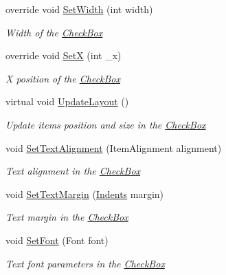 \begin{DoxyCompactItemize}
override void \mbox{\hyperlink{class_space_v_i_l_1_1_check_box_abcf26de1908f7d590b768d64851e8004}{Set\+Width}} (int width)
\begin{DoxyCompactList}\small\item\em Width of the \mbox{\hyperlink{class_space_v_i_l_1_1_check_box}{Check\+Box}} \end{DoxyCompactList}\item 
override void \mbox{\hyperlink{class_space_v_i_l_1_1_check_box_a321e86a7868cb30b842988a4d607acc1}{SetX}} (int \+\_\+x)
\begin{DoxyCompactList}\small\item\em X position of the \mbox{\hyperlink{class_space_v_i_l_1_1_check_box}{Check\+Box}} \end{DoxyCompactList}\item 
virtual void \mbox{\hyperlink{class_space_v_i_l_1_1_check_box_a03402e85defa2b269c933b9000d70835}{Update\+Layout}} ()
\begin{DoxyCompactList}\small\item\em Update items position and size in the \mbox{\hyperlink{class_space_v_i_l_1_1_check_box}{Check\+Box}} \end{DoxyCompactList}\item 
void \mbox{\hyperlink{class_space_v_i_l_1_1_check_box_a71a14c9714447fe4d3c9347b920dbedb}{Set\+Text\+Alignment}} (Item\+Alignment alignment)
\begin{DoxyCompactList}\small\item\em Text alignment in the \mbox{\hyperlink{class_space_v_i_l_1_1_check_box}{Check\+Box}} \end{DoxyCompactList}\item 
void \mbox{\hyperlink{class_space_v_i_l_1_1_check_box_a17a587e2ad59ded92f7ca6968285b8de}{Set\+Text\+Margin}} (\mbox{\hyperlink{struct_space_v_i_l_1_1_decorations_1_1_indents}{Indents}} margin)
\begin{DoxyCompactList}\small\item\em Text margin in the \mbox{\hyperlink{class_space_v_i_l_1_1_check_box}{Check\+Box}} \end{DoxyCompactList}\item 
void \mbox{\hyperlink{class_space_v_i_l_1_1_check_box_aa2c476ef3b72afc85fa42a685df7535e}{Set\+Font}} (Font font)
\begin{DoxyCompactList}\small\item\em Text font parameters in the \mbox{\hyperlink{class_space_v_i_l_1_1_check_box}{Check\+Box}} \end{DoxyCompactList}\item 

\end{DoxyCompactItemize}
